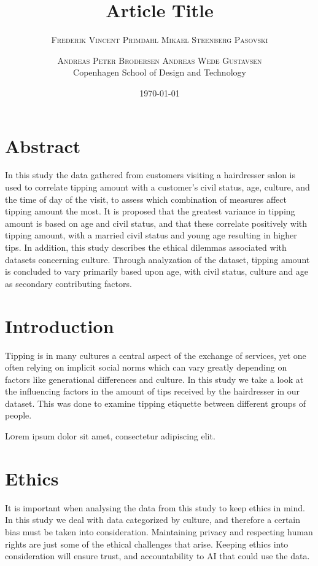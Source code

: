 \documentclass[twoside,twocolumn]{article}
\title{Article Title} %
\author{%
\textsc{Frederik Vincent Primdahl} \textsc{Mikael Steenberg Pasovski} \and \textsc{Andreas Peter Brodersen} \textsc{Andreas Wede Gustavsen}\\
\normalsize Copenhagen School of Design and Technology\\ %
}
\date{\today} %
\begin{document}
\maketitle


\section{Abstract}
In this study the data gathered from customers visiting a hairdresser salon is used to correlate tipping amount with a customer's civil status, age, culture, and the time of day of the visit, to assess which combination of measures affect tipping amount the most. It is proposed that the greatest variance in tipping amount is based on age and civil status, and that these correlate positively with tipping amount, with a married civil status and young age resulting in higher tips. In addition, this study describes the ethical dilemmas associated with datasets concerning culture. Through analyzation of the dataset, tipping amount is concluded to vary primarily based upon age, with civil status, culture and age as secondary contributing factors.

\section{Introduction}
Tipping is in many cultures a central aspect of the exchange of services, yet one often relying on implicit social norms which can vary greatly depending on factors like generational differences and culture. In this study we take a look at the influencing factors in the amount of tips received by the hairdresser in our dataset. This was done to examine tipping etiquette between different groups of people.

\lettrine[nindent=0em,lines=3]{L} orem ipsum dolor sit amet, consectetur adipiscing elit.

\section{Ethics} It is important when analysing the data from this study to keep ethics in mind. In this study we deal with data categorized by culture, and therefore a certain bias must be taken into consideration. Maintaining privacy and respecting human rights are just some of the ethical challenges that arise. Keeping ethics into consideration will ensure trust, and accountability to AI that could use the data.
\end{document}
